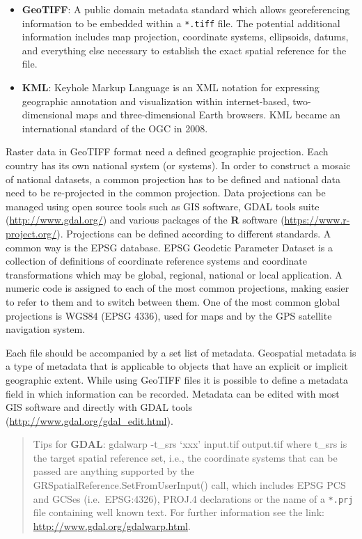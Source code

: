 \documentclass[10pt,b5paper,]{book}
\providecommand{\tightlist}{%
  \setlength{\itemsep}{0pt}\setlength{\parskip}{0pt}}
\theoremstyle{definition}
\theoremstyle{definition}
\theoremstyle{definition}
\theoremstyle{remark}
\begin{document}
\begin{itemize}
\tightlist
\item
  \textbf{GeoTIFF}: A public domain metadata standard which allows
  georeferencing information to be embedded within a \texttt{*.tiff}
  file. The potential additional information includes map projection,
  coordinate systems, ellipsoids, datums, and everything else necessary
  to establish the exact spatial reference for the file.
\item
  \textbf{KML}: Keyhole Markup Language is an XML notation for
  expressing geographic annotation and visualization within
  internet-based, two-dimensional maps and three-dimensional Earth
  browsers. KML became an international standard of the OGC in 2008.
\end{itemize}

Raster data in GeoTIFF format need a defined geographic projection. Each
country has its own national system (or systems). In order to construct
a mosaic of national datasets, a common projection has to be defined and
national data need to be re-projected in the common projection. Data
projections can be managed using open source tools such as GIS software,
GDAL tools suite (\url{http://www.gdal.org/}) and various packages of
the \textbf{R} software (\url{https://www.r-project.org/}). Projections
can be defined according to different standards. A common way is the
EPSG database. EPSG Geodetic Parameter Dataset is a collection of
definitions of coordinate reference systems and coordinate
transformations which may be global, regional, national or local
application. A numeric code is assigned to each of the most common
projections, making easier to refer to them and to switch between them.
One of the most common global projections is WGS84 (EPSG 4336), used for
maps and by the GPS satellite navigation system.

Each file should be accompanied by a set list of metadata. Geospatial
metadata is a type of metadata that is applicable to objects that have
an explicit or implicit geographic extent. While using GeoTIFF files it
is possible to define a metadata field in which information can be
recorded. Metadata can be edited with most GIS software and directly
with GDAL tools (\url{http://www.gdal.org/gdal_edit.html}).

\begin{quote}
Tips for \textbf{GDAL}: gdalwarp -t\_srs `xxx' input.tif output.tif
where t\_srs is the target spatial reference set, i.e., the coordinate
systems that can be passed are anything supported by the
GRSpatialReference.SetFromUserInput() call, which includes EPSG PCS and
GCSes (i.e.~EPSG:4326), PROJ.4 declarations or the name of a
\texttt{*.prj} file containing well known text. For further information
see the link: \url{http://www.gdal.org/gdalwarp.html}.
\end{quote}
\end{document}
